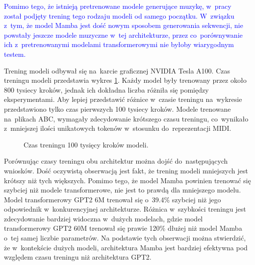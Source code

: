 \documentclass[data-science]{agh-wi} %
\begin{document}
\textcolor{blue}{Pomimo tego, że istnieją pretrenowane modele generujące muzykę, w~pracy został podjęty trening tego rodzaju modeli od samego początku. W~związku z~tym, że model Mamba jest dość nowym sposobem generowania sekwencji, nie powstały jeszcze modele muzyczne w~tej architekturze, przez co~porównywanie ich z~pretrenowanymi modelami transformerowymi nie byłoby wiarygodnym testem.}

Trening modeli odbywał się na~karcie graficznej NVIDIA Tesla A100. Czas treningu modeli przedstawia wykres \ref*{fig:czas_treningu}. Każdy model były trenowany przez około 800 tysiecy kroków, jednak ich dokładna liczba różniła się pomiędzy eksperymentami. Aby lepiej przedstawić różnice w~czasie treningu na~wykresie przedstawiono tylko czas pierwszych 100 tysiecy kroków. Modele trenowane na~plikach ABC, wymagały zdecydowanie krótszego czasu treningu, co~wynikało z~mniejszej ilości unikatowych tokenów w~stosunku do~reprezentacji MIDI.

\begin{figure}[ht!]
    \centering
    \caption{Czas treningu 100 tysięcy kroków modeli.}\label{fig:czas_treningu}
\end{figure}

Porównując czasy treningu obu architektur można dojść do~następujących wniosków. Dość oczywistą obserwacją jest fakt, że trening modeli mniejszych jest krótszy niż tych większych. Pomimo tego, że model Mamba powinien trenować się szybciej niż modele transformerowe, nie jest to prawdą dla mniejszego modelu. Model transformerowy GPT2 6M trenował się o~39.4\% szybciej niż jego odpowiednik w~konkurencyjnej architekturze. Różnica w~szybkości treningu jest zdecydowanie bardziej widoczna w~dużych modelach, gdzie model transformerowy GPT2 60M trenował się prawie 120\% dłużej niż model Mamba o~tej samej liczbie parametrów. Na podstawie tych obserwacji można stwierdzić, że w~kontekście dużych modeli, architektura Mamba jest bardziej efektywna pod względem czasu treningu niż architektura GPT2.
\end{document}
